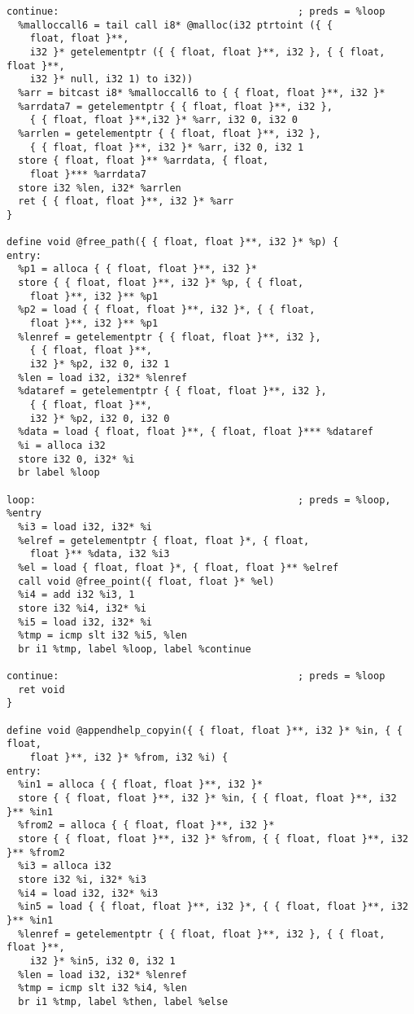 \documentclass[main.tex]{subfiles}
\begin{document}
{\begin{lstlisting}
continue:                                         ; preds = %loop
  %malloccall6 = tail call i8* @malloc(i32 ptrtoint ({ { 
    float, float }**,
    i32 }* getelementptr ({ { float, float }**, i32 }, { { float, float }**,
    i32 }* null, i32 1) to i32))
  %arr = bitcast i8* %malloccall6 to { { float, float }**, i32 }*
  %arrdata7 = getelementptr { { float, float }**, i32 }, 
    { { float, float }**,i32 }* %arr, i32 0, i32 0
  %arrlen = getelementptr { { float, float }**, i32 }, 
    { { float, float }**, i32 }* %arr, i32 0, i32 1
  store { float, float }** %arrdata, { float,
    float }*** %arrdata7
  store i32 %len, i32* %arrlen
  ret { { float, float }**, i32 }* %arr
}

define void @free_path({ { float, float }**, i32 }* %p) {
entry:
  %p1 = alloca { { float, float }**, i32 }*
  store { { float, float }**, i32 }* %p, { { float, 
    float }**, i32 }** %p1
  %p2 = load { { float, float }**, i32 }*, { { float,
    float }**, i32 }** %p1
  %lenref = getelementptr { { float, float }**, i32 }, 
    { { float, float }**, 
    i32 }* %p2, i32 0, i32 1
  %len = load i32, i32* %lenref
  %dataref = getelementptr { { float, float }**, i32 },
    { { float, float }**, 
    i32 }* %p2, i32 0, i32 0
  %data = load { float, float }**, { float, float }*** %dataref
  %i = alloca i32
  store i32 0, i32* %i
  br label %loop

loop:                                             ; preds = %loop, %entry
  %i3 = load i32, i32* %i
  %elref = getelementptr { float, float }*, { float,
    float }** %data, i32 %i3
  %el = load { float, float }*, { float, float }** %elref
  call void @free_point({ float, float }* %el)
  %i4 = add i32 %i3, 1
  store i32 %i4, i32* %i
  %i5 = load i32, i32* %i
  %tmp = icmp slt i32 %i5, %len
  br i1 %tmp, label %loop, label %continue

continue:                                         ; preds = %loop
  ret void
}

define void @appendhelp_copyin({ { float, float }**, i32 }* %in, { { float,
    float }**, i32 }* %from, i32 %i) {
entry:
  %in1 = alloca { { float, float }**, i32 }*
  store { { float, float }**, i32 }* %in, { { float, float }**, i32 }** %in1
  %from2 = alloca { { float, float }**, i32 }*
  store { { float, float }**, i32 }* %from, { { float, float }**, i32 }** %from2
  %i3 = alloca i32
  store i32 %i, i32* %i3
  %i4 = load i32, i32* %i3
  %in5 = load { { float, float }**, i32 }*, { { float, float }**, i32 }** %in1
  %lenref = getelementptr { { float, float }**, i32 }, { { float, float }**,
    i32 }* %in5, i32 0, i32 1
  %len = load i32, i32* %lenref
  %tmp = icmp slt i32 %i4, %len
  br i1 %tmp, label %then, label %else


\end{lstlisting}}
\end{document}

